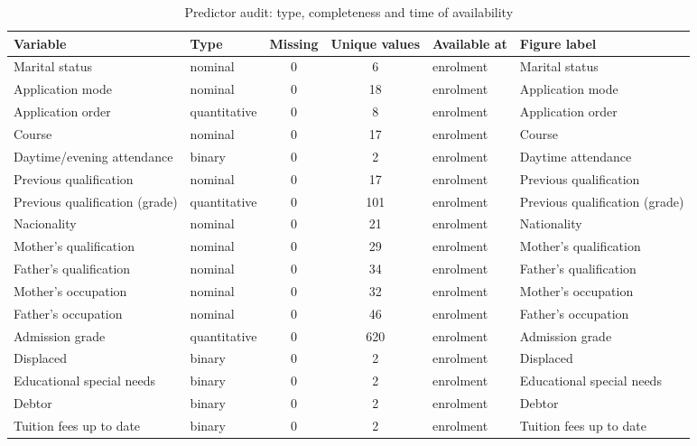 \providecommand{\botrule}{\bottomrule}

\begin{table}[!htbp]
\caption{Predictor audit: type, completeness and time of availability}\label{tab:TableS1_data_audit}
\small
\begin{tabular*}{\textwidth}{@{\extracolsep\fill}@{}llccll@{}}
\toprule
Variable & Type & Missing & Unique values & Available at & Figure label \\
\midrule
Marital status & nominal & 0 & 6 & enrolment & Marital status \\
Application mode & nominal & 0 & 18 & enrolment & Application mode \\
Application order & quantitative & 0 & 8 & enrolment & Application order \\
Course & nominal & 0 & 17 & enrolment & Course \\
Daytime/evening attendance & binary & 0 & 2 & enrolment & Daytime attendance \\
Previous qualification & nominal & 0 & 17 & enrolment & Previous qualification \\
Previous qualification (grade) & quantitative & 0 & 101 & enrolment & Previous qualification (grade) \\
Nacionality & nominal & 0 & 21 & enrolment & Nationality \\
Mother's qualification & nominal & 0 & 29 & enrolment & Mother's qualification \\
Father's qualification & nominal & 0 & 34 & enrolment & Father's qualification \\
Mother's occupation & nominal & 0 & 32 & enrolment & Mother's occupation \\
Father's occupation & nominal & 0 & 46 & enrolment & Father's occupation \\
Admission grade & quantitative & 0 & 620 & enrolment & Admission grade \\
Displaced & binary & 0 & 2 & enrolment & Displaced \\
Educational special needs & binary & 0 & 2 & enrolment & Educational special needs \\
Debtor & binary & 0 & 2 & enrolment & Debtor \\
Tuition fees up to date & binary & 0 & 2 & enrolment & Tuition fees up to date \\

\end{tabular*}
\end{table}
